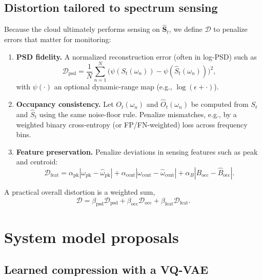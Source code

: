 \documentclass[11pt]{article}
\begin{document}
\subsection{Distortion tailored to spectrum sensing}
Because the cloud ultimately performs sensing on $\hat{\mathbf{S}}_t$, we define $\mathcal{D}$ to penalize errors that matter for monitoring:
\begin{enumerate}
\item \textbf{PSD fidelity.} A normalized reconstruction error (often in log-PSD) such as
\begin{equation}
\mathcal{D}_{\mathrm{psd}} = \frac{1}{N}\sum_{n=1}^{N} \big(\psi(S_t(\omega_n))-\psi(\hat{S}_t(\omega_n))\big)^2,
\end{equation}
with $\psi(\cdot)$ an optional dynamic-range map (e.g., $\log(\epsilon+\cdot)$).

\item \textbf{Occupancy consistency.} Let $O_t(\omega_n)$ and $\hat{O}_t(\omega_n)$ be computed from $S_t$ and $\hat{S}_t$ using the same noise-floor rule. Penalize mismatches, e.g., by a weighted binary cross-entropy (or FP/FN-weighted) loss across frequency bins.

\item \textbf{Feature preservation.} Penalize deviations in sensing features such as peak and centroid:
\begin{equation}
\mathcal{D}_{\mathrm{feat}} =
\alpha_{\mathrm{pk}}|\omega_{\mathrm{pk}}-\hat{\omega}_{\mathrm{pk}}|
+\alpha_{\mathrm{cent}}|\omega_{\mathrm{cent}}-\hat{\omega}_{\mathrm{cent}}|
+\alpha_{B}|B_{\mathrm{occ}}-\hat{B}_{\mathrm{occ}}|.
\end{equation}
\end{enumerate}
A practical overall distortion is a weighted sum,
\begin{equation}
\mathcal{D} = \beta_{\mathrm{psd}}\mathcal{D}_{\mathrm{psd}} + \beta_{\mathrm{occ}}\mathcal{D}_{\mathrm{occ}} + \beta_{\mathrm{feat}}\mathcal{D}_{\mathrm{feat}}.
\end{equation}


\section{System model proposals}

\subsection{Learned compression with a VQ-VAE}
\end{document}
